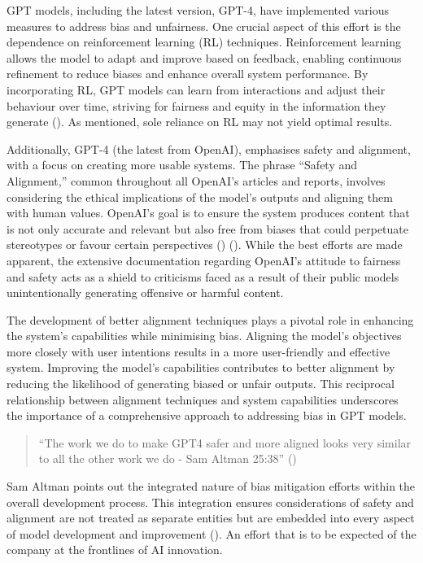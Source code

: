 \documentclass[12pt]{article}
\begin{document}
GPT models, including the latest version, GPT-4, have implemented various measures to address bias and unfairness. One crucial aspect of this effort is the dependence on reinforcement learning (RL) techniques. Reinforcement learning allows the model to adapt and improve based on feedback, enabling continuous refinement to reduce biases and enhance overall system performance. By incorporating RL, GPT models can learn from interactions and adjust their behaviour over time, striving for fairness and equity in the information they generate (\cite{matsuo-2022}). As mentioned, sole reliance on RL may not yield optimal results. 

Additionally, GPT-4 (the latest from OpenAI), emphasises safety and alignment, with a focus on creating more usable systems. The phrase “Safety and Alignment,” common throughout all OpenAI’s articles and reports, involves considering the ethical implications of the model's outputs and aligning them with human values. OpenAI’s goal is to ensure the system produces content that is not only accurate and relevant but also free from biases that could perpetuate stereotypes or favour certain perspectives (\cite{openai-no-dateC}) (\cite{openai-no-dateB}). While the best efforts are made apparent, the extensive documentation regarding OpenAI's attitude to fairness and safety acts as a shield to criticisms faced as a result of their public models unintentionally generating offensive or harmful content.

The development of better alignment techniques plays a pivotal role in enhancing the system's capabilities while minimising bias. Aligning the model's objectives more closely with user intentions results in a more user-friendly and effective system. Improving the model's capabilities contributes to better alignment by reducing the likelihood of generating biased or unfair outputs. This reciprocal relationship between alignment techniques and system capabilities underscores the importance of a comprehensive approach to addressing bias in GPT models. 

\begin{quote}
    “The work we do to make GPT4 safer and more aligned looks very similar to all the other work we do - Sam Altman 25:38” (\cite{lex-fridman-2023})
\end{quote}

Sam Altman points out the integrated nature of bias mitigation efforts within the overall development process. This integration ensures considerations of safety and alignment are not treated as separate entities but are embedded into every aspect of model development and improvement (\cite{lex-fridman-2023}). An effort that is to be expected of the company at the frontlines of AI innovation.
\end{document}
